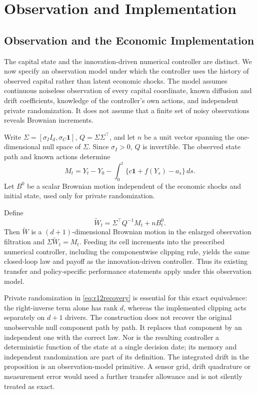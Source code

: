 \section{Observation and Implementation}\label{app:r15observationtheory}
\subsection{Observation and the Economic Implementation}\label{sec:r12observation}
The capital state and the innovation-driven numerical controller are distinct. We now specify an observation model under which the controller uses the history of observed capital rather than latent economic shocks. The model assumes continuous noiseless observation of every capital coordinate, known diffusion and drift coefficients, knowledge of the controller's own actions, and independent private randomization. It does not assume that a finite set of noisy observations reveals Brownian increments.

Write $\Sigma=[\sigma_I I_d,\sigma_C\bm1]$, $Q=\Sigma\Sigma^\top$, and let $n$ be a unit vector spanning the one-dimensional null space of $\Sigma$. Since $\sigma_I>0$, $Q$ is invertible. The observed state path and known actions determine
\[
 M_t=Y_t-Y_0-\int_0^t\{c\bm1+f(Y_s)-a_s\}\,ds.
\]
Let $B^0$ be a scalar Brownian motion independent of the economic shocks and initial state, used only for private randomization.

\begin{proposition}\label{prop:r12observation}
Define
\begin{equation}\label{eq:r12recovery}
 \widetilde W_t=\Sigma^\top Q^{-1}M_t+nB^0_t.
\end{equation}
Then $\widetilde W$ is a $(d+1)$-dimensional Brownian motion in the enlarged observation filtration and $\Sigma\widetilde W_t=M_t$. Feeding its cell increments into the prescribed numerical controller, including the componentwise clipping rule, yields the same closed-loop law and payoff as the innovation-driven controller. Thus its existing transfer and policy-specific performance statements apply under this observation model.
\end{proposition}

Private randomization in \eqref{eq:r12recovery} is essential for this exact equivalence: the right-inverse term alone has rank $d$, whereas the implemented clipping acts separately on $d+1$ drivers. The construction does not recover the original unobservable null component path by path. It replaces that component by an independent one with the correct law. Nor is the resulting controller a deterministic function of the state at a single decision date; its memory and independent randomization are part of its definition. The integrated drift in the proposition is an observation-model primitive. A sensor grid, drift quadrature or measurement error would need a further transfer allowance and is not silently treated as exact.


